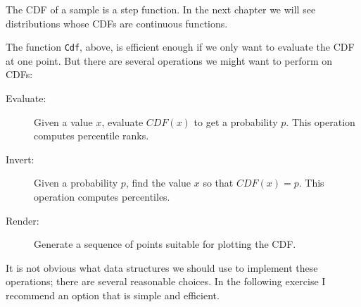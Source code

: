 \documentclass[10pt]{book}
\begin{document}
The CDF of a sample is a step function.  In the next chapter we
will see distributions whose CDFs are continuous functions.  

The function {\tt Cdf}, above, is efficient enough if we only want
to evaluate the CDF at one point.  But there are several operations
we might want to perform on CDFs:

\begin{description}

\item[Evaluate:] Given a value $x$, evaluate $CDF(x)$ to get a
  probability $p$.  This operation computes percentile ranks.

\item[Invert:] Given a probability $p$, find the value $x$ so that
  $CDF(x) = p$.  This operation computes percentiles.

\item[Render:] Generate a sequence of points suitable for plotting the
  CDF.

\end{description}

It is not obvious what data structures we should use to implement
these operations; there are several reasonable choices.  In the
following exercise I recommend an option that is simple and efficient.
\end{document}
